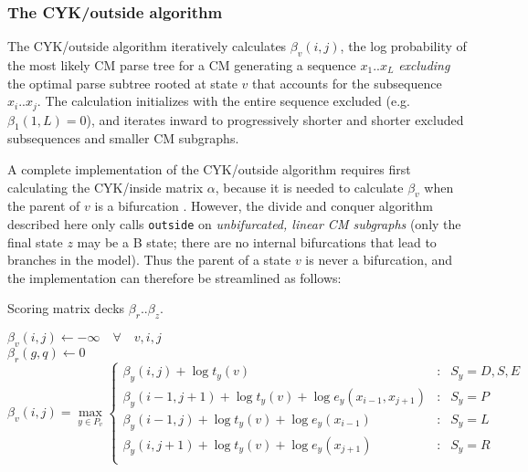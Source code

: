 \documentclass[11pt]{article}
\begin{document}
\subsubsection{The CYK/outside algorithm}

The CYK/outside algorithm iteratively calculates $\beta_v(i,j)$, the
log probability of the most likely CM parse tree for a CM generating a
sequence $x_1..x_L$ \emph{excluding} the optimal parse subtree rooted
at state $v$ that accounts for the subsequence $x_i..x_j$. The
calculation initializes with the entire sequence excluded (e.g.
$\beta_1(1,L) = 0$), and iterates inward to progressively shorter and
shorter excluded subsequences and smaller CM subgraphs.

A complete implementation of the CYK/outside algorithm requires first
calculating the CYK/inside matrix $\alpha$, because it is needed to
calculate $\beta_v$ when the parent of $v$ is a bifurcation
\cite{Lari90,Lari91,Durbin98}. However, the divide and conquer
algorithm described here only calls \texttt{outside} on
\emph{unbifurcated, linear CM subgraphs} (only the final state $z$ may
be a B state; there are no internal bifurcations that lead to branches
in the model). Thus the parent of a state $v$ is never a bifurcation,
and the implementation can therefore be streamlined as follows:

\begin{algorithm}
         {Scoring matrix decks $\beta_r..\beta_z$.}
\begin{algtab*}
 $\beta_v(i,j) \leftarrow -\infty \quad \forall \quad v,i,j$\\
 $\beta_r(g,q) \leftarrow 0$\\
       $\beta_v(i,j) = \max\limits_{y \in P_v} \left\{
              \begin{array}{rcl}
              \beta_y(i,j) + \log t_y(v) &:&  S_y = D,S,E \\
              \beta_y(i-1,j+1) + \log t_y(v) + \log e_y(x_{i-1}, x_{j+1}) &:& S_y = P\\
              \beta_y(i-1,j) + \log t_y(v) + \log e_y(x_{i-1}) &:& S_y = L\\
              \beta_y(i,j+1) + \log t_y(v) + \log e_y(x_{j+1})  &:& S_y = R \\
              \end{array} \right.$
\end{algtab*}
\end{algorithm}
\end{document}
